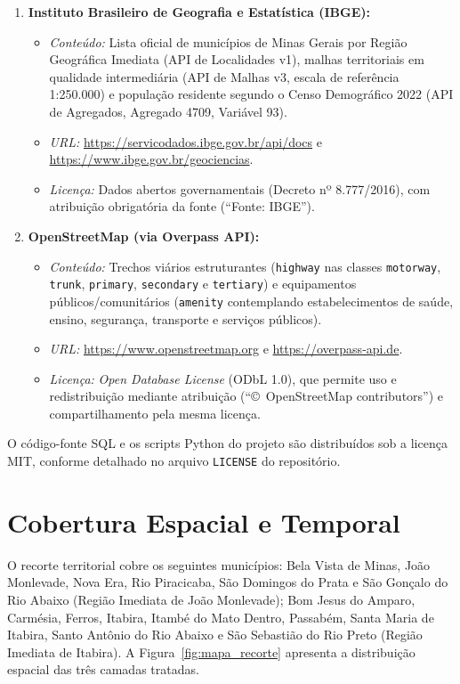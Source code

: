 \documentclass[
    12pt,
    oneside,
    a4paper,
    chapter=TITLE,
    section=TITLE,
    brazil
]{abntex2}
\begin{document}
\begin{enumerate}
    \item \textbf{Instituto Brasileiro de Geografia e Estatística (IBGE):}
    \begin{itemize}
        \item \emph{Conteúdo:} Lista oficial de municípios de Minas Gerais por Região Geográfica Imediata (API de Localidades v1), malhas territoriais em qualidade intermediária (API de Malhas v3, escala de referência 1:250.000) e população residente segundo o Censo Demográfico 2022 (API de Agregados, Agregado 4709, Variável 93).
        \item \emph{URL:} \url{https://servicodados.ibge.gov.br/api/docs} e \url{https://www.ibge.gov.br/geociencias}.
        \item \emph{Licença:} Dados abertos governamentais (Decreto nº 8.777/2016), com atribuição obrigatória da fonte (``Fonte: IBGE'').
    \end{itemize}
    \item \textbf{OpenStreetMap (via Overpass API):}
    \begin{itemize}
        \item \emph{Conteúdo:} Trechos viários estruturantes (\texttt{highway} nas classes \texttt{motorway}, \texttt{trunk}, \texttt{primary}, \texttt{secondary} e \texttt{tertiary}) e equipamentos públicos/comunitários (\texttt{amenity} contemplando estabelecimentos de saúde, ensino, segurança, transporte e serviços públicos).
        \item \emph{URL:} \url{https://www.openstreetmap.org} e \url{https://overpass-api.de}.
        \item \emph{Licença:} \emph{Open Database License} (ODbL 1.0), que permite uso e redistribuição mediante atribuição (``\copyright~OpenStreetMap contributors'') e compartilhamento pela mesma licença.
    \end{itemize}
\end{enumerate}

O código-fonte SQL e os scripts Python do projeto são distribuídos sob a licença MIT, conforme detalhado no arquivo \texttt{LICENSE} do repositório.

\section{Cobertura Espacial e Temporal}

O recorte territorial cobre os seguintes municípios: Bela Vista de Minas, João Monlevade, Nova Era, Rio Piracicaba, São Domingos do Prata e São Gonçalo do Rio Abaixo (Região Imediata de João Monlevade); Bom Jesus do Amparo, Carmésia, Ferros, Itabira, Itambé do Mato Dentro, Passabém, Santa Maria de Itabira, Santo Antônio do Rio Abaixo e São Sebastião do Rio Preto (Região Imediata de Itabira). A Figura~\ref{fig:mapa_recorte} apresenta a distribuição espacial das três camadas tratadas.
\end{document}
